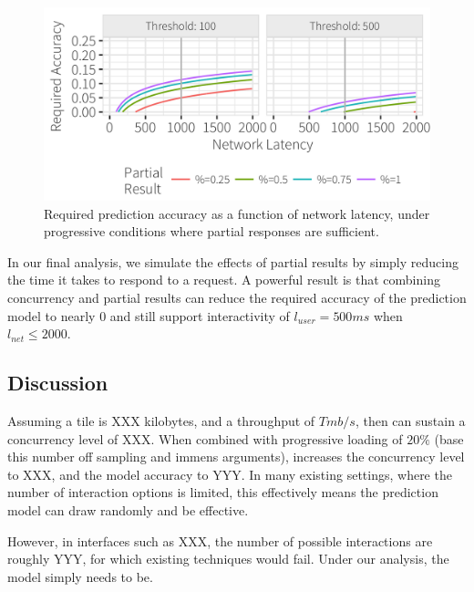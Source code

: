 \begin{figure}[hb]
	\centering
	\includegraphics[width=1\columnwidth]{figures/model_partial}
 	\caption{Required prediction accuracy as a function of network latency, under progressive conditions where partial responses are sufficient.}
    \label{fig:model_partial}
\end{figure}


  In our final analysis, we simulate the effects of partial results by simply reducing the time it takes to respond to a request.
A powerful result is that combining concurrency and partial results can reduce the required accuracy of the prediction model to nearly $0$ and still support interactivity of $l_{user}=500ms$ when $l_{net}\le 2000$.






\subsection{Discussion}




Assuming a tile is XXX kilobytes, and a throughput of $T mb/s$, then can sustain a concurrency level of XXX.  
When combined with progressive loading of $20\%$ (base this number off sampling and immens arguments), increases the concurrency level to XXX, 
and the model accuracy to YYY.  In many existing settings, where the number of interaction options is limited, this effectively means the prediction model
can draw randomly and be effective.  


However, in interfaces such as XXX, the number of possible interactions are roughly YYY, for which existing techniques would fail.  Under our analysis, the model simply needs to be.

